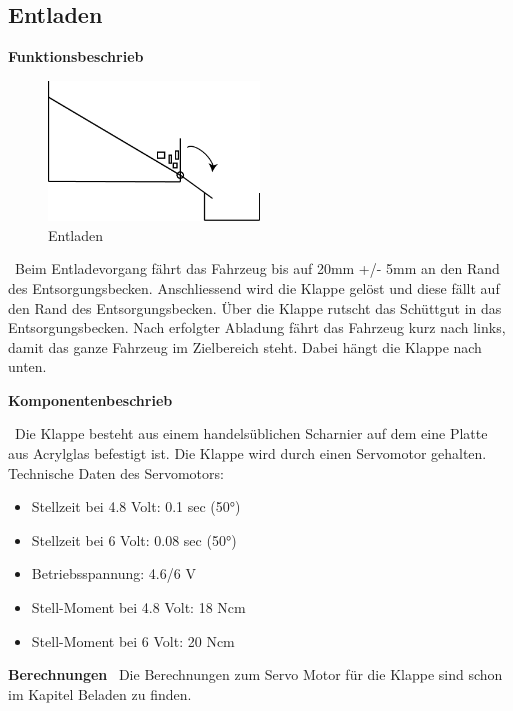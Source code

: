 \subsection{Entladen}

\textbf{Funktionsbeschrieb}\\[0.2cm]
\begin{figure}[H]
\centering
\includegraphics[width=0.5\textwidth]{03_Loesungskonzept/pictures/Entladen_Schraegbehaelter.png}
\caption{Entladen}
\end{figure}

\ Beim Entladevorgang fährt das Fahrzeug bis auf 20mm +/- 5mm an den Rand des Entsorgungsbecken. Anschliessend wird die Klappe gelöst und diese fällt auf den Rand des Entsorgungsbecken. Über die Klappe rutscht das Schüttgut in das Entsorgungsbecken. Nach erfolgter Abladung fährt das Fahrzeug kurz nach links, damit das ganze Fahrzeug im Zielbereich steht. Dabei hängt die Klappe nach unten.

\textbf{Komponentenbeschrieb}

\ Die Klappe besteht aus einem handelsüblichen Scharnier auf dem eine Platte aus Acrylglas befestigt ist.
Die Klappe wird durch einen Servomotor gehalten.\\
Technische Daten des Servomotors:
\begin{itemize}
\item Stellzeit bei 4.8 Volt: 0.1 sec (50°) 
\item Stellzeit bei 6 Volt: 0.08 sec (50°) 
\item Betriebsspannung: 4.6/6 V
\item Stell-Moment bei 4.8 Volt: 18 Ncm
 \item Stell-Moment bei 6 Volt: 20 Ncm 
\end{itemize}

\textbf{Berechnungen}
\ Die Berechnungen zum Servo Motor für die Klappe sind schon im Kapitel Beladen zu finden.